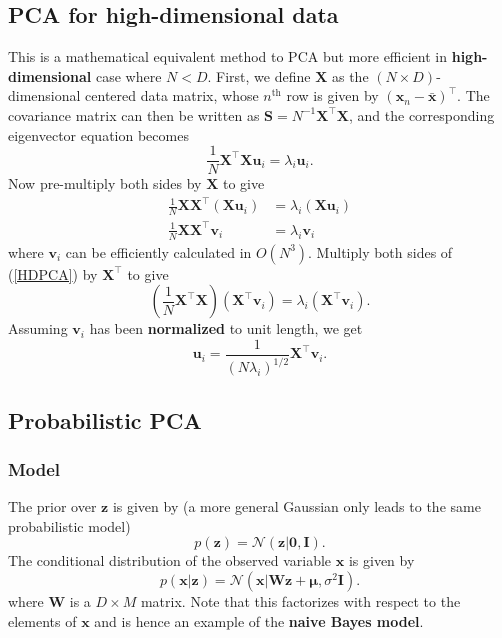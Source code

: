 \documentclass[a4paper]{book}
\newcommand{\up}{\mathrm}
\renewcommand{\bf}{\mathbf}
\renewcommand{\cal}{\mathcal}
\newcommand{\bs}{\boldsymbol}
\begin{document}
\subsection{PCA for high-dimensional data}
This is a mathematical equivalent method to PCA but more efficient in \textbf{high-dimensional} case where $N < D$. First, we define $\bf{X}$ as the $(N \times D)$-dimensional centered data matrix, whose $n^{\up{th}}$ row is given by $(\bf{x}_n-\bar{\bf{x}})^{\intercal}$. The covariance matrix can then be written as $\bf{S} = N^{-1} \bf{X}^{\intercal} \bf{X}$, and the corresponding eigenvector equation becomes
\begin{equation}
	\frac{1}{N} \bf{X}^{\intercal} \bf{X}\bf{u}_i = \lambda_i \bf{u}_i.
\end{equation}
Now pre-multiply both sides by $\bf{X}$ to give
\begin{align}
	\frac{1}{N} \bf{XX}^{\intercal} (\bf{Xu}_i) &= \lambda_i (\bf{Xu}_i) \\
	\frac{1}{N} \bf{XX}^{\intercal} \bf{v}_i &= \lambda_i \bf{v}_i \label{HDPCA}
\end{align}
where $\bf{v}_i$ can be efficiently calculated in $O(N^3)$. Multiply both sides of (\ref{HDPCA}) by $\bf{X}^{\intercal}$ to give
\begin{equation}
	\left( \frac{1}{N} \bf{X}^{\intercal}\bf{X} \right)(\bf{X}^{\intercal} \bf{v}_i) = \lambda_i (\bf{X}^{\intercal} \bf{v}_i).
\end{equation}
Assuming $\bf{v}_i$ has been \textbf{normalized} to unit length, we get
\begin{equation}
	\bf{u}_i = \frac{1}{(N\lambda_i)^{1/2}} \bf{X}^{\intercal} \bf{v}_i.
\end{equation}
\subsection{Probabilistic PCA}
\subsubsection{Model}
The prior over $\bf{z}$ is given by (a more general Gaussian only leads to the same probabilistic model)
\begin{equation}
	p(\bf{z}) = \cal{N}(\bf{z}|\bf{0},\bf{I}).
\end{equation}
The conditional distribution of the observed variable $\bf{x}$ is given by
\begin{equation}
	p(\bf{x|z}) = \cal{N}(\bf{x}|\bf{Wz}+\bs{\mu},\sigma^2\bf{I}).
\end{equation}
where $\bf{W}$ is a $D \times M$ matrix. Note that this factorizes with respect to the elements of $\bf{x}$ and is hence an example of the \textbf{naive Bayes model}.
\end{document}
